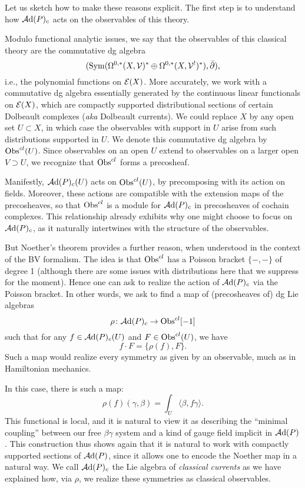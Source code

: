 \subsubsection{}

Let us sketch how to make these reasons explicit.
The first step is to understand how $\mathcal A{\rm d}(P)_c$ acts on the observables of this theory.

Modulo functional analytic issues,
we say that the observables of this classical theory are the commutative dg algebra
\[
({\rm Sym}(\Omega^{0,*}(X,\mathcal V)^* \oplus \Omega^{0,*}(X, \mathcal V^!)^*), \Bar{\partial}),
\]
i.e., the polynomial functions on $\mathcal E(X)$.
More accurately, we work with a commutative dg algebra essentially generated by the continuous linear functionals on $\mathcal E(X)$, 
which are compactly supported distributional sections of certain Dolbeault complexes ({\it aka} Dolbeault currents).
We could replace $X$ by any open set $U \subset X$, 
in which case the observables with support in $U$ arise from such distributions supported in $U$.
We denote this commutative dg algebra by ${\rm Obs}^{cl}(U)$.
Since observables on an open $U$ extend to observables on a larger open $V \supset U$,
we recognize that ${\rm Obs}^{cl}$ forms a precosheaf.

Manifestly, $\mathcal A{\rm d}(P)_c(U)$ acts on ${\rm Obs}^{cl}(U)$,
by precomposing with its action on fields.
Moreover, these actions are compatible with the extension maps of the precosheaves,
so that ${\rm Obs}^{cl}$ is a module for $\mathcal A{\rm d}(P)_c$ in precosheaves of cochain complexes.
This relationship already exhibits why one might choose to focus on $\mathcal A{\rm d}(P)_c$,
as it naturally intertwines with the structure of the observables.

But Noether's theorem provides a further reason,
when understood in the context of the BV formalism.
The idea is that ${\rm Obs}^{cl}$ has a Poisson bracket $\{-,-\}$ of degree 1
(although there are some issues with distributions here that we suppress for the moment).
Hence one can ask to realize the action of $\mathcal A{\rm d}(P)_c$ via the Poisson bracket.
In other words, we ask to find a map of (precosheaves of) dg Lie algebras
\[
\rho \colon \mathcal A{\rm d}(P)_c \to {\rm Obs}^{cl}[-1]
\]
such that for any $f \in \mathcal A{\rm d}(P)_c(U)$ and $F \in {\rm Obs}^{cl}(U)$,
we have
\[
f \cdot F = \{\rho(f),F\}.
\]
Such a map would realize every symmetry as given by an observable,
much as in Hamiltonian mechanics.

In this case, there is such a map:
\[
\rho(f)(\gamma,\beta) = \int_U \langle\beta, f \gamma\rangle.
\]
This functional is local, and it is natural to view it as describing the ``minimal coupling'' between our free $\beta\gamma$ system and a kind of gauge field implicit in $\mathcal A{\rm d}(P)$.
This construction thus shows again that it is natural to work with compactly supported sections of $\mathcal A{\rm d}(P)$,
since it allows one to encode the Noether map in a natural way.
We call $\mathcal A{\rm d}(P)_c$ the Lie algebra of {\em classical currents} as we have explained how, via $\rho$, we realize these symmetries as classical observables.

